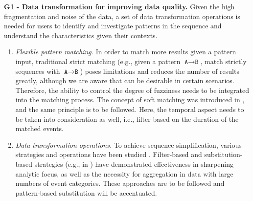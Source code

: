 \documentclass[camera]{vgtc}                          %
\begin{document}
\vspace{-4pt}
\noindent
\textbf{G1 - Data transformation for improving data quality.} Given the high fragmentation and noise of the data, a set of data transformation operations is needed for users to identify and investigate patterns in the sequence and understand the characteristics given their contexts. 
\renewcommand{\theenumi}{\textbf{R\arabic{enumi}}}
\begin{enumerate}
    \itemsep0em
    \vspace{-4pt}
    \item \textit{Flexible pattern matching.} In order to match more results given a pattern input, traditional strict matching (e.g., given a pattern $ \texttt{A} \rightarrow \texttt{B} $, match strictly sequences with $ \texttt{A} \rightarrow \texttt{B} $) poses limitations and reduces the number of results greatly, although we are aware that can be desirable in certain scenarios. Therefore, the ability to control the degree of fuzziness needs to be integrated into the matching process. The concept of soft matching was introduced in \cite{Gotz2016Soft}, and the same principle is to be followed. Here, the temporal aspect needs to be taken into consideration as well, i.e., filter based on the duration of the matched events.
    
    \vspace{-4pt}
    \item \textit{Data transformation operations.} To achieve sequence simplification, various strategies and operations have been studied \cite{Du2017Coping}. Filter-based and substitution-based strategies (e.g., in \cite{Monroe2013Temporal}) have demonstrated effectiveness in sharpening analytic focus, as well as the necessity for aggregation \cite{Elmqvist2010Hierarchical} in data with large numbers of event categories. These approaches are to be followed and pattern-based substitution will be accentuated.
\end{enumerate}
\end{document}
